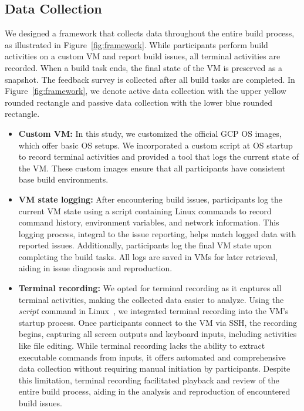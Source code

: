 \documentclass[10pt, conference]{IEEEtran}
\begin{document}
\subsection{Data Collection}
We designed a framework that collects data throughout the entire build process, as illustrated in Figure~\ref{fig:framework}. While participants perform build activities on a custom VM and report build issues, all terminal activities are recorded. When a build task ends, the final state of the VM is preserved as a snapshot. The feedback survey is collected after all build tasks are completed. In Figure~\ref{fig:framework}, we denote active data collection with the upper yellow rounded rectangle and passive data collection with the lower blue rounded rectangle.

\begin{itemize}[leftmargin=*]
\item \textbf{Custom VM:}
In this study, we customized the official GCP OS images, which offer basic OS setups. We incorporated a custom script at OS startup to record terminal activities and provided a tool that logs the current state of the VM. These custom images ensure that all participants have consistent base build environments.
\item \textbf{VM state logging:}
After encountering build issues, participants log the current VM state using a script containing Linux commands to record command history, environment variables, and network information. This logging process, integral to the issue reporting, helps match logged data with reported issues. Additionally, participants log the final VM state upon completing the build tasks. All logs are saved in VMs for later retrieval, aiding in issue diagnosis and reproduction.
\item \textbf{Terminal recording:}
We opted for terminal recording as it captures all terminal activities, making the collected data easier to analyze. Using the \textit{script} command in Linux~\cite{script}, we integrated terminal recording into the VM's startup process. Once participants connect to the VM via SSH, the recording begins, capturing all screen outputs and keyboard inputs, including activities like file editing. While terminal recording lacks the ability to extract executable commands from inputs, it offers automated and comprehensive data collection without requiring manual initiation by participants. Despite this limitation, terminal recording facilitated playback and review of the entire build process, aiding in the analysis and reproduction of encountered build issues.

\end{itemize}
\end{document}
